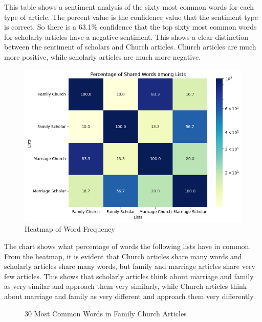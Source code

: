 \documentclass[twocolumn]{article}
\begin{document}
This table shows a sentiment analysis of the sixty most common words for each type of article. The percent value is the confidence value that the sentiment type is correct. So there is a 63.1\% confidence that the top sixty most common words for scholarly articles have a negative sentiment. This shows a clear distinction between the sentiment of scholars and Church articles. Church articles are much more positive, while scholarly articles are much more negative.
\begin{figure}[h]
    \centering
    \includegraphics[width=\linewidth]{../heatmap.png}
    \caption{Heatmap of Word Frequency}
    \label{fig:heatmap}
\end{figure}

The chart shows what percentage of words the following lists have in common. From the heatmap, it is evident that Church articles share many words and scholarly articles share many words, but family and marriage articles share very few articles. This shows that scholarly articles think about marriage and family as very similar and approach them very similarly, while Church articles think about marriage and family as very different and approach them very differently.



\begin{figure}[h]
    \centering
    \caption{30 Most Common Words in Family Church Articles}
    \label{fig:fcwc}
\end{figure}
\end{document}
